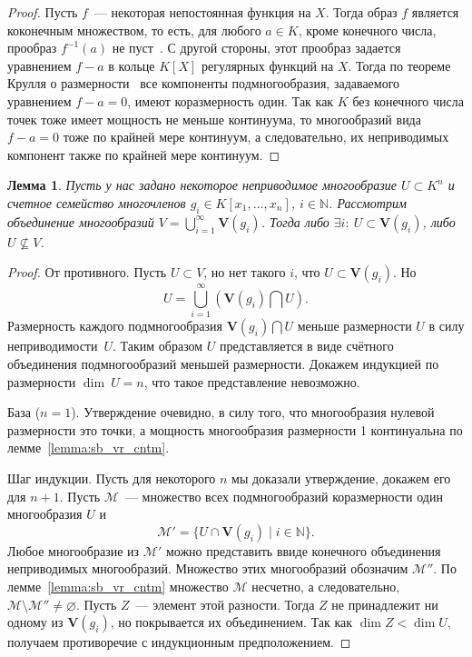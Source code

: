 \documentclass[16pt]{article}
\theoremstyle{plain1}
\newtheorem{lemma}[theorem1]{Лемма}
\theoremstyle{plain2}
\theoremstyle{plain}
\theoremstyle{plain3}
\theoremstyle{definition}
\theoremstyle{remark}
\begin{document}
\begin{proof}
Пусть $f$~--- некоторая
непостоянная функция на $X$. Тогда образ $f$ является
коконечным множеством, то есть, для любого $a\in K$, кроме конечного
числа, прообраз $f^{-1}(a)$ не пуст~\cite[глава 2, \S3, упр. 3.19]{Hartshorn}. С другой стороны,
этот прообраз задается уравнением $f-a$ в кольце $K[X]$
регулярных функций на $X$. Тогда по теореме Крулля о размерности~\cite[Chapter~5,
Section~12, Theorem~18]{Matsumura} все
компоненты подмногообразия, задаваемого уравнением $f-a=0$, имеют
коразмерность один. Так как $K$ без конечного числа точек тоже
имеет мощность не меньше континуума, то многообразий вида $f-a=0$ тоже по крайней мере континуум, а следовательно, их
неприводимых компонент также по крайней мере континуум.
\end{proof}

\begin{lemma} \label{lemma:o vlojenii}
Пусть у нас задано некоторое неприводимое многообразие
$U\subset K^n$ и счетное семейство многочленов
$g_i\in K[x_1,\ldots,x_n]$, $i \in \mathbb{N}$. Рассмотрим объединение
многообразий $V=\bigcup\limits
_{i=1}^{\infty}\mathbf{V}(g_i)$. Тогда либо
$\exists i:\: U \subset \mathbf{V}(g_i)$, либо
$U\nsubseteq V$.
\end{lemma}

\begin{proof}
От противного. Пусть $U\subset V$, но нет такого
$i$, что $U \subset \mathbf{V}(g_i)$.
Но
$$
U=\bigcup\limits_{i=1}^{\infty}\left(\mathbf{V}(g_i)\bigcap U\right).
$$
Размерность каждого подмногообразия
$\mathbf{V}(g_i)\bigcap U$ меньше
размерности $U$ в силу неприводимости~$U$.
Таким образом $U$ представляется в виде счётного объединения
подмногообразий меньшей размерности. 
Докажем индукцией
по размерности $\dim~U=n$,
что такое представление невозможно.

База ($n=1$). Утверждение очевидно, в силу того, что многообразия
нулевой размерности это точки, а мощность многообразия
размерности 1 континуальна по лемме~\ref{lemma:sb_vr_cntm}.

Шаг индукции. Пусть для некоторого $n$ мы доказали утверждение, докажем его для $n+1$.
Пусть $\mathcal M$~--- множество всех подмногообразий коразмерности
один многообразия $U$ и
$$
\mathcal M' = \{ U\cap \mathbf{V}(g_i)\mid i\in \mathbb N \}.
$$
Любое многообразие из $\mathcal M' $ можно представить ввиде конечного объединения  неприводимых многообразий. Множество этих многообразий обозначим  $\mathcal M'' $. По лемме~\ref{lemma:sb_vr_cntm} множество $\mathcal M$ несчетно, а
следовательно, $\mathcal M\setminus\mathcal M''\neq \varnothing$.
Пусть $Z$~--- элемент этой разности. Тогда $Z$ не принадлежит ни
одному из $\mathbf{V}(g_i)$, но покрывается их
объединением. Так как $\dim Z<\dim U$, получаем
противоречие с индукционным предположением.
\end{proof}
\end{document}
